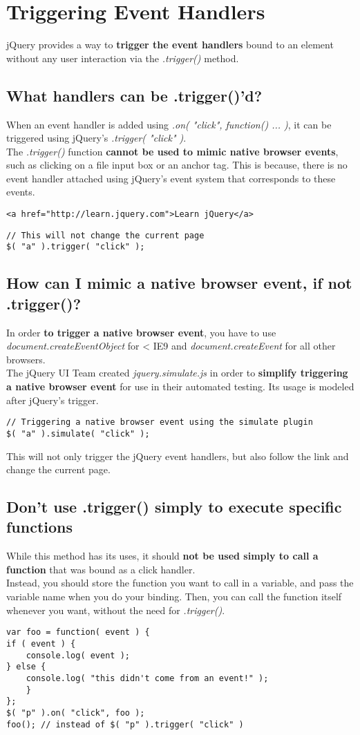 \documentclass[10pt,letterpaper]{report}
\begin{document}
\section{Triggering Event Handlers}
jQuery provides a way to \textbf{trigger the event handlers} bound to an element without any user interaction via the \textit{.trigger()} method.
\subsection{What handlers can be .trigger()'d?}
When an event handler is added using \textit{.on( "click", function() {...} )}, it can be triggered using jQuery's \textit{.trigger( "click" )}.\\ The \textit{.trigger()} function \textbf{cannot be used to mimic native browser events}, such as clicking on a file input box or an anchor tag. This is because, there is no event handler attached using jQuery's event system that corresponds to these events.
\lstset{language=HTML} 
\begin{lstlisting}
<a href="http://learn.jquery.com">Learn jQuery</a>
\end{lstlisting}
\lstset{language=JavaScript} 
\begin{lstlisting}
// This will not change the current page
$( "a" ).trigger( "click" );
\end{lstlisting}
\subsection{How can I mimic a native browser event, if not .trigger()?}
In order \textbf{to trigger a native browser event}, you have to use \textit{document.createEventObject} for < IE9 and \textit{document.createEvent} for all other browsers.\\
The jQuery UI Team created \textit{jquery.simulate.js} in order to \textbf{simplify triggering a native browser event} for use in their automated testing. Its usage is modeled after jQuery's trigger.
\begin{lstlisting}
// Triggering a native browser event using the simulate plugin
$( "a" ).simulate( "click" );
\end{lstlisting}
This will not only trigger the jQuery event handlers, but also follow the link and change the current page.
\subsection{Don't use .trigger() simply to execute specific functions}
While this method has its uses, it should \textbf{not be used simply to call a function} that was bound as a click handler.\\ Instead, you should store the function you want to call in a variable, and pass the variable name when you do your binding. Then, you can call the function itself whenever you want, without the need for \textit{.trigger()}.
\begin{lstlisting}
var foo = function( event ) {
if ( event ) {
	console.log( event );
} else {
	console.log( "this didn't come from an event!" );
	}
};
$( "p" ).on( "click", foo );
foo(); // instead of $( "p" ).trigger( "click" )
\end{lstlisting}
\end{document}
